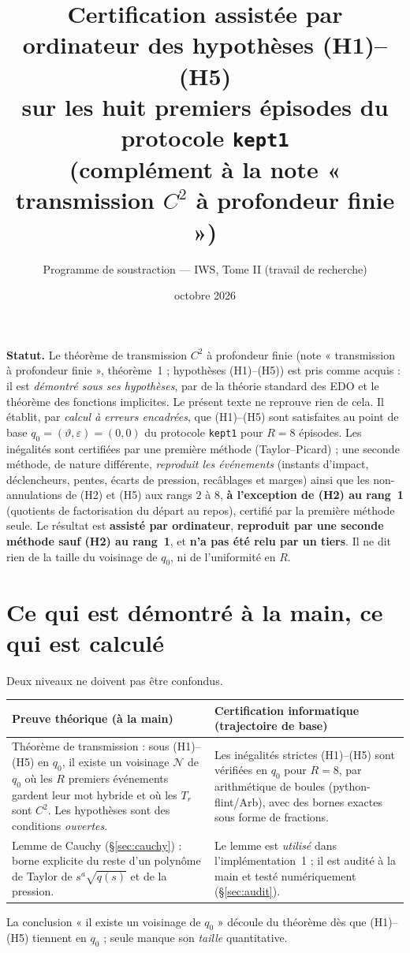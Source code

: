 \documentclass[11pt,a4paper]{article}
\title{Certification assistée par ordinateur des hypothèses (H1)--(H5)\\ sur les huit premiers épisodes du protocole \texttt{kept1}\\[2pt]
\large (complément à la note « transmission $C^2$ à profondeur finie »)}
\author{Programme de soustraction --- IWS, Tome II (travail de recherche)}
\date{octobre 2026}
\theoremstyle{remark}
\newcommand{\vth}{\vartheta}
\begin{document}
\maketitle

\noindent\textbf{Statut.} Le théorème de transmission $C^2$ à profondeur finie (note « transmission à profondeur finie », théorème~1 ; hypothèses (H1)--(H5)) est pris comme acquis : il est \emph{démontré sous ses hypothèses}, par de la théorie standard des EDO et le théorème des fonctions implicites. Le présent texte ne reprouve rien de cela. Il établit, par \emph{calcul à erreurs encadrées}, que (H1)--(H5) sont satisfaites au point de base $q_0=(\vth,\varepsilon)=(0,0)$ du protocole \texttt{kept1} pour $R=8$ épisodes. Les inégalités sont certifiées par une première méthode (Taylor--Picard) ; une seconde méthode, de nature différente, \emph{reproduit les événements} (instants d'impact, déclencheurs, pentes, écarts de pression, recâblages et marges) ainsi que les non-annulations de (H2) et (H5) aux rangs $2$ à $8$, \textbf{à l'exception de (H2) au rang~1} (quotients de factorisation du départ au repos), certifié par la première méthode seule. Le résultat est \textbf{assisté par ordinateur}, \textbf{reproduit par une seconde méthode sauf (H2) au rang~1}, et \textbf{n'a pas été relu par un tiers}. Il ne dit rien de la taille du voisinage de $q_0$, ni de l'uniformité en $R$.

\section{Ce qui est démontré à la main, ce qui est calculé}\label{sec:distinction}
Deux niveaux ne doivent pas être confondus.
\begin{center}
\begin{tabular}{p{}p{}}
\toprule
\textbf{Preuve théorique (à la main)} & \textbf{Certification informatique (trajectoire de base)}\\
\midrule
Théorème de transmission : sous (H1)--(H5) en $q_0$, il existe un voisinage $\mathcal N$ de $q_0$ où les $R$ premiers événements gardent leur mot hybride et où les $T_r$ sont $C^2$. Les hypothèses sont des conditions \emph{ouvertes}. &
Les inégalités strictes (H1)--(H5) sont vérifiées en $q_0$ pour $R=8$, par arithmétique de boules (python-flint/Arb), avec des bornes exactes sous forme de fractions.\\[4pt]
Lemme de Cauchy (§\ref{sec:cauchy}) : borne explicite du reste d'un polynôme de Taylor de $s^a\sqrt{q(s)}$ et de la pression. &
Le lemme est \emph{utilisé} dans l'implémentation~1 ; il est audité à la main et testé numériquement (§\ref{sec:audit}).\\
\bottomrule
\end{tabular}
\end{center}
La conclusion « il existe un voisinage de $q_0$ » découle du théorème dès que (H1)--(H5) tiennent en $q_0$ ; seule manque son \emph{taille} quantitative.
\end{document}
